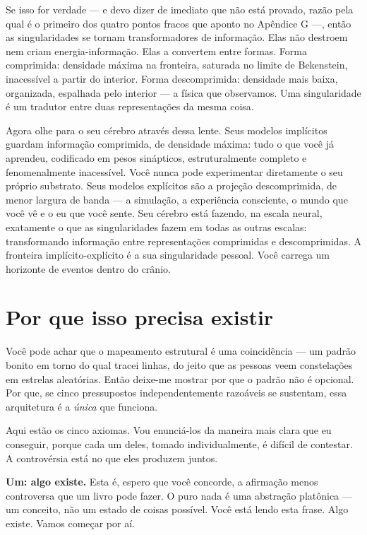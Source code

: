 \documentclass[11pt, twoside, openright]{book}
\begin{document}
Se isso for verdade --- e devo dizer de imediato que não está provado, razão pela qual é o primeiro dos quatro pontos fracos que aponto no Apêndice G ---, então as singularidades se tornam transformadores de informação. Elas não destroem nem criam energia-informação. Elas a convertem entre formas. Forma comprimida: densidade máxima na fronteira, saturada no limite de Bekenstein, inacessível a partir do interior. Forma descomprimida: densidade mais baixa, organizada, espalhada pelo interior --- a física que observamos. Uma singularidade é um tradutor entre duas representações da mesma coisa.

Agora olhe para o seu cérebro através dessa lente. Seus modelos implícitos guardam informação comprimida, de densidade máxima: tudo o que você já aprendeu, codificado em pesos sinápticos, estruturalmente completo e fenomenalmente inacessível. Você nunca pode experimentar diretamente o seu próprio substrato. Seus modelos explícitos são a projeção descomprimida, de menor largura de banda --- a simulação, a experiência consciente, o mundo que você vê e o eu que você sente. Seu cérebro está fazendo, na escala neural, exatamente o que as singularidades fazem em todas as outras escalas: transformando informação entre representações comprimidas e descomprimidas. A fronteira implícito-explícito é a sua singularidade pessoal. Você carrega um horizonte de eventos dentro do crânio.

\section*{Por que isso precisa existir}

Você pode achar que o mapeamento estrutural é uma coincidência --- um padrão bonito em torno do qual tracei linhas, do jeito que as pessoas veem constelações em estrelas aleatórias. Então deixe-me mostrar por que o padrão não é opcional. Por que, se cinco pressupostos independentemente razoáveis se sustentam, essa arquitetura é a \textit{única} que funciona.

Aqui estão os cinco axiomas. Vou enunciá-los da maneira mais clara que eu conseguir, porque cada um deles, tomado individualmente, é difícil de contestar. A controvérsia está no que eles produzem juntos.

\textbf{Um: algo existe.} Esta é, espero que você concorde, a afirmação menos controversa que um livro pode fazer. O puro nada é uma abstração platônica --- um conceito, não um estado de coisas possível. Você está lendo esta frase. Algo existe. Vamos começar por aí.
\end{document}
